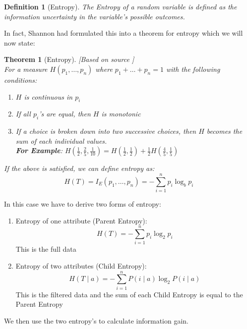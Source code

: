 \documentclass[11pt,a4paper]{report}
\newtheorem{theorem}{Theorem}
\newtheorem{definition}{Definition}
\begin{document}
\begin{definition}[Entropy]\cite{Shannon}
The Entropy of a random variable is defined as the information uncertainty in the variable's possible outcomes.
\end{definition}
In fact, Shannon had formulated this into a theorem for entropy which we will now state:
\begin{theorem}[Entropy] [Based on source \cite[Section 6, p. 10]{Shannon}]\\
For a measure $H(p_1,\dots,p_n)$ where $p_1 + \dots + p_n = 1$ with the following conditions:
\begin{enumerate}
    \item $H$ is continuous in $p_i$
    
    \item If all $p_i$'s are equal, then $H$ is monotonic
    
    \item If a choice is broken down into two successive choices, then $H$ becomes the sum of each individual values.\\
    \textbf{For Example}: $H(\frac{1}{2}, \frac{2}{5}, \frac{1}{10}) = H(\frac{1}{2}, \frac{1}{2}) + \frac{1}{2}H(\frac{4}{5}, \frac{1}{5})$
\end{enumerate}
If the above is satisfied, we can define entropy as:
\begin{equation}
    H(T) = I_E (p_1, \dots , p_n) = -\sum_{i=1}^{n} p_i \log_b p_i
\end{equation}
\end{theorem}
In this case we have to derive two forms of entropy:

\begin{enumerate}
    \item Entropy of one attribute (Parent Entropy):
    \begin{equation}
        H(T) = -\sum_{i=1}^{n} p_i \log_2 p_i
    \end{equation}
    This is the full data
    
    \item Entropy of two attributes (Child Entropy):
    \begin{equation}
       H(T \mid a) = -\sum_{i=1}^{n} P(i \mid a) \log_2 P(i \mid a) 
    \end{equation}
    This is the filtered data and the sum of each Child Entropy is equal to the Parent Entropy
\end{enumerate}
We then use the two entropy's to calculate information gain.
\end{document}
